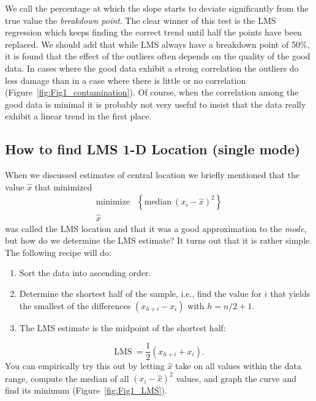
	We call the percentage at which the slope starts to deviate significantly from the true value the \emph{breakdown point}.
The clear winner of this test is the LMS regression which 
keeps finding the correct trend until half the points have been replaced.  We should add that 
while LMS always have a breakdown point of 50\%, it is found that the effect of the outliers often
depends on the quality of the good data.  In cases where 
the good data exhibit a strong correlation the outliers do less damage than in a case where there 
is little or no correlation (Figure~\ref{fig:Fig1_contamination}).  Of course, when the correlation among the good data is minimal it is 
probably not very useful to insist that the data really exhibit a linear trend in the first place.


\subsection{How to find LMS 1-D Location (single mode)}

When we discussed estimates of central location we briefly mentioned that the value $\hat{x}$
that minimized
\begin{equation}
\begin{array}{cc}
\mbox{minimize} & \! \! \left \{ \mbox{median} \ (x_i - \hat{x})^2 \right \} \\
\hat{x} & \end{array}
\end{equation}
was called the LMS location and that it was a good approximation to the \emph{mode}, but how do we 
determine the LMS estimate?  It turns out that it is rather simple.  The following recipe 
will do:
\begin{enumerate}
\item	Sort the data into ascending order.
\item	Determine the shortest half of the sample, i.e., find the value for $i$ that yields the smallest of the differences $(x_{h+i} 
- x_i)$ with $h = n/2 + 1$.
\item	The LMS estimate is the midpoint of the shortest half:
\end{enumerate}
\begin{equation}
\mbox{LMS} \ = \frac{1}{2} (x_{h +i} + x_i).
\end{equation}	 	
You can empirically try this out by letting $\hat{x}$ take on all values within the data range, compute the median
of all $(x_i - \hat{x})^2$ values, and graph the curve and find its minimum (Figure~\ref{fig:Fig1_LMS}).

